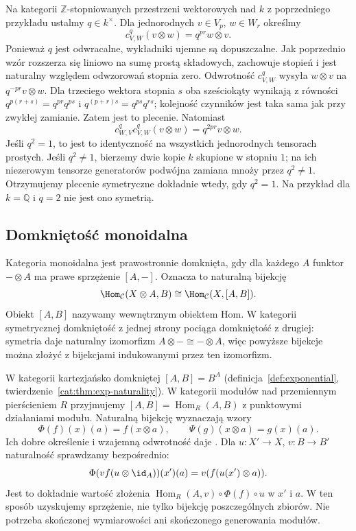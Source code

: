 \begin{przyklad}\label{cat:ex:nonsymmetric-braiding}
Na kategorii $\mathbb Z$-stopniowanych przestrzeni wektorowych nad $k$ z poprzedniego przykładu ustalmy $q\in k^\times$. Dla jednorodnych $v\in V_p$, $w\in W_r$ określmy
\[
c^q_{V,W}(v\otimes w)=q^{pr}w\otimes v.
\]
Ponieważ $q$ jest odwracalne, wykładniki ujemne są dopuszczalne. Jak poprzednio wzór rozszerza się liniowo na sumę prostą składowych, zachowuje stopień i jest naturalny względem odwzorowań stopnia zero. Odwrotność $c^q_{V,W}$ wysyła $w\otimes v$ na $q^{-pr}v\otimes w$. Dla trzeciego wektora stopnia $s$ oba sześciokąty wynikają z równości $q^{p(r+s)}=q^{pr}q^{ps}$ i $q^{(p+r)s}=q^{ps}q^{rs}$; kolejność czynników jest taka sama jak przy zwykłej zamianie. Zatem jest to plecenie.
Natomiast
\[
c^q_{W,V}c^q_{V,W}(v\otimes w)=q^{2pr}v\otimes w.
\]
Jeśli $q^2=1$, to jest to identyczność na wszystkich jednorodnych tensorach prostych. Jeśli $q^2\neq1$, bierzemy dwie kopie $k$ skupione w stopniu $1$; na ich niezerowym tensorze generatorów podwójna zamiana mnoży przez $q^2\neq1$. Otrzymujemy plecenie symetryczne dokładnie wtedy, gdy $q^2=1$. Na przykład dla $k=\mathbb Q$ i $q=2$ nie jest ono symetrią.
\end{przyklad}

\subsection{Domkniętość monoidalna}
\begin{definicja}\label{cat:def:monoidal-closed}
Kategoria monoidalna jest prawostronnie domknięta, gdy dla każdego $A$ funktor $-\otimes A$ ma prawe sprzężenie $[A,-]$. Oznacza to naturalną bijekcję
\[
\Hom_{\mathcal C}(X\otimes A,B)\cong\Hom_{\mathcal C}(X,[A,B]).
\]
Obiekt $[A,B]$ nazywamy wewnętrznym obiektem Hom. W kategorii symetrycznej domkniętość z jednej strony pociąga domkniętość z drugiej: symetria daje naturalny izomorfizm $A\otimes-\cong-\otimes A$, więc powyższe bijekcje można złożyć z bijekcjami indukowanymi przez ten izomorfizm.
\end{definicja}

\begin{przyklad}\label{cat:ex:closed-monoidal}
W kategorii kartezjańsko domkniętej $[A,B]=B^A$ (definicja~\ref{def:exponential}, twierdzenie~\ref{cat:thm:exp-naturality}). W kategorii modułów nad przemiennym pierścieniem $R$ przyjmujemy $[A,B]=\operatorname{Hom}_R(A,B)$ z punktowymi działaniami modułu. Naturalną bijekcję wyznaczają wzory
\[
\Phi(f)(x)(a)=f(x\otimes a),\qquad
\Psi(g)(x\otimes a)=g(x)(a).
\]
Ich dobre określenie i wzajemną odwrotność daje . Dla $u:X'\to X$, $v:B\to B'$ naturalność sprawdzamy bezpośrednio:
\[
\Phi(vf(u\otimes\id_A))(x')(a)=v(f(u(x')\otimes a)).
\]
Jest to dokładnie wartość złożenia $\operatorname{Hom}_R(A,v)\circ\Phi(f)\circ u$ w $x'$ i $a$. W ten sposób uzyskujemy sprzężenie, nie tylko bijekcję poszczególnych zbiorów. Nie potrzeba skończonej wymiarowości ani skończonego generowania modułów.
\end{przyklad}

